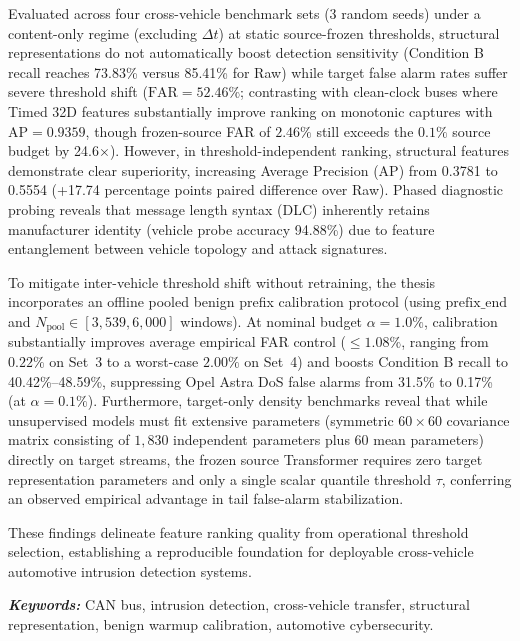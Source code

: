 \documentclass[12pt, a4paper, reqno, oneside]{book}
\begin{document}
Evaluated across four cross-vehicle benchmark sets (3 random seeds) under a content-only regime (excluding $\Delta t$) at static source-frozen thresholds, structural representations do not automatically boost detection sensitivity (Condition B recall reaches 73.83\% versus 85.41\% for Raw) while target false alarm rates suffer severe threshold shift ($\text{FAR} = 52.46\%$; contrasting with clean-clock buses where Timed 32D features substantially improve ranking on monotonic captures with $\text{AP} = 0.9359$, though frozen-source FAR of $2.46\%$ still exceeds the $0.1\%$ source budget by 24.6$\times$). However, in threshold-independent ranking, structural features demonstrate clear superiority, increasing Average Precision (AP) from 0.3781 to 0.5554 (+17.74 percentage points paired difference over Raw). Phased diagnostic probing reveals that message length syntax (DLC) inherently retains manufacturer identity (vehicle probe accuracy 94.88\%) due to feature entanglement between vehicle topology and attack signatures.

To mitigate inter-vehicle threshold shift without retraining, the thesis incorporates an offline pooled benign prefix calibration protocol (using $\mathrm{prefix\_end}$ and $N_{\text{pool}} \in [3{,}539, 6{,}000]$ windows). At nominal budget $\alpha = 1.0\%$, calibration substantially improves average empirical FAR control ($\le 1.08\%$, ranging from $0.22\%$ on Set~3 to a worst-case $2.00\%$ on Set~4) and boosts Condition B recall to 40.42\%--48.59\%, suppressing Opel Astra DoS false alarms from 31.5\% to 0.17\% (at $\alpha = 0.1\%$). Furthermore, target-only density benchmarks reveal that while unsupervised models must fit extensive parameters (symmetric $60\times 60$ covariance matrix consisting of $1{,}830$ independent parameters plus $60$ mean parameters) directly on target streams, the frozen source Transformer requires zero target representation parameters and only a single scalar quantile threshold $\tau$, conferring an observed empirical advantage in tail false-alarm stabilization.

These findings delineate feature ranking quality from operational threshold selection, establishing a reproducible foundation for deployable cross-vehicle automotive intrusion detection systems.

\vspace{0.2em}
\noindent \textit{\textbf{Keywords:}} CAN bus, intrusion detection, cross-vehicle transfer, structural representation, benign warmup calibration, automotive cybersecurity.
\end{document}
